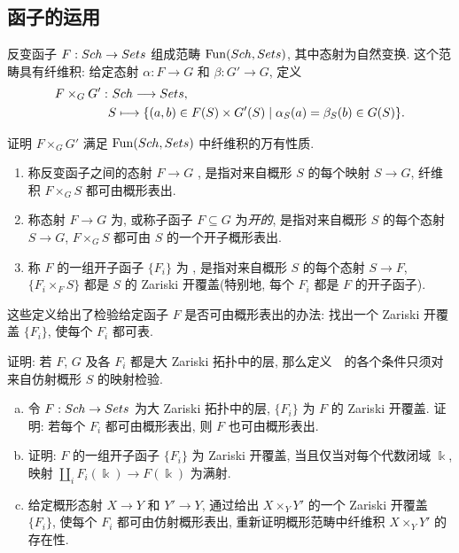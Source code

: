 \subsection{函子的运用}\label{src:1.3.7-subsection}
反变函子 $F:Sch\to Sets$ 组成范畴 $\operatorname{Fun}(Sch,Sets)$, 其中态射为自然变换. 这个范畴具有纤维积: 给定态射 $\alpha:F\to G$ 和 $\beta:G'\to G$, 定义
\[
\begin{aligned}
F\times_G G':&\ Sch\longrightarrow Sets,\\
&S\longmapsto
\{(a,b)\in F(S)\times G'(S)\mid\alpha_S(a)=\beta_S(b)\in G(S)\}.
\end{aligned}
\]
\begin{exercise}[简单]\label{src:1.3.41}
证明 $F\times_G G'$ 满足 $\operatorname{Fun}(Sch,Sets)$ 中纤维积的万有性质.
\end{exercise}
\begin{definition}\label{src:1.3.42}
\begin{enumerate}[(1)]
\item 称反变函子之间的态射 $F\to G$ , 是指对来自概形 $S$ 的每个映射 $S\to G$, 纤维积 $F\times_G S$ 都可由概形表出.
\item 称态射 $F\to G$ 为, 或称子函子 $F\subseteq G$ 为\textit{开的}, 是指对来自概形 $S$ 的每个态射 $S\to G$, $F\times_G S$ 都可由 $S$ 的一个开子概形表出.
\item 称 $F$ 的一组开子函子 $\{F_i\}$ 为 , 是指对来自概形 $S$ 的每个态射 $S\to F$, $\{F_i\times_F S\}$ 都是 $S$ 的 Zariski 开覆盖(特别地, 每个 $F_i$ 都是 $F$ 的开子函子).
\end{enumerate}
\end{definition}
这些定义给出了检验给定函子 $F$ 是否可由概形表出的办法: 找出一个 Zariski 开覆盖 $\{F_i\}$, 使每个 $F_i$ 都可表.
\begin{exercise}[简单]\label{src:1.3.43}
证明: 若 $F$, $G$ 及各 $F_i$ 都是大 Zariski 拓扑中的层, 那么定义~~的各个条件只须对来自仿射概形 $S$ 的映射检验.
\end{exercise}
\begin{exercise}[适于练习]\label{src:1.3.44}
\begin{enumerate}[(a)]
\item 令 $F:Sch\to Sets$ 为大 Zariski 拓扑中的层, $\{F_i\}$ 为 $F$ 的 Zariski 开覆盖. 证明: 若每个 $F_i$ 都可由概形表出, 则 $F$ 也可由概形表出.
\item 证明: $F$ 的一组开子函子 $\{F_i\}$ 为 Zariski 开覆盖, 当且仅当对每个代数闭域 $\Bbbk$, 映射 $\coprod_i F_i(\Bbbk)\to F(\Bbbk)$ 为满射.
\item 给定概形态射 $X\to Y$ 和 $Y'\to Y$, 通过给出 $X\times_Y Y'$ 的一个 Zariski 开覆盖 $\{F_i\}$, 使每个 $F_i$ 都可由仿射概形表出, 重新证明概形范畴中纤维积 $X\times_Y Y'$ 的存在性.
\end{enumerate}
\end{exercise}
